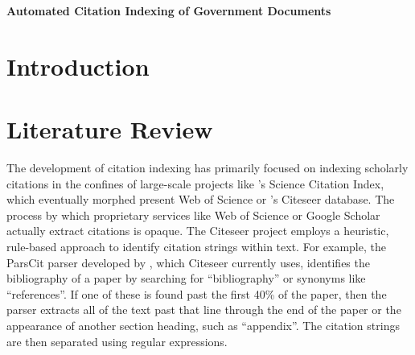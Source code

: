 \documentclass[12pt]{article}
\begin{document}
\parindent=30pt
\renewcommand{\thefootnote}{\fnsymbol{footnote}}



\doublespace
\setcounter{page}{1}
\renewcommand{\thefootnote}{\fnsymbol{footnote}}

\normalsize
{}

\singlespace
\begin{center}

\huge \textbf{Automated Citation Indexing of Government Documents} \\


\vspace{1cm}
\large
\normalsize\vspace*{8.5cm}



\end{center}
\vspace{3.5cm}


\singlespace \noindent 


\newpage
\doublespace
\setcounter{page}{1}
\renewcommand{\thefootnote}{\arabic{footnote}} \setcounter{footnote}{0}
\normalsize
{}


\section{Introduction}

\section{Literature Review}
The development of citation indexing has primarily focused on indexing scholarly citations in the confines of large-scale projects like 's Science Citation Index, which eventually morphed present Web of Science or 's Citeseer database. The process by which proprietary services like Web of Science or Google Scholar actually extract citations is opaque. The Citeseer project employs a heuristic, rule-based approach to identify citation strings within text. For example, the ParsCit parser developed by , which Citeseer currently uses, identifies the bibliography of a paper by searching for ``bibliography'' or synonyms like ``references''. If one of these is found past the first 40\% of the paper, then the parser extracts all of the text past that line through the end of the paper or the appearance of another section heading, such as ``appendix''. The citation strings are then separated using regular expressions. \\
\end{document}
